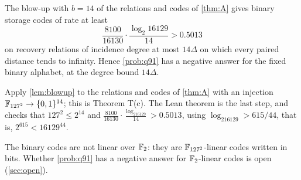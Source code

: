 \begin{corollary}[Corollary A$'$]\label{cor:Aprime}
The blow-up with $b=14$ of the relations and codes of \cref{thm:A} gives binary storage codes of rate at least
\[
  \frac{8100}{16130}\cdot\frac{\log_2 16129}{14}>0.5013
\]
on recovery relations of incidence degree at most $14\Delta$ on which every paired distance tends to infinity. Hence
\cref{prob:q91} has a negative answer for the fixed binary alphabet, at the degree bound $14\Delta$.
\end{corollary}
\begin{outline}
Apply \cref{lem:blowup} to the relations and codes of \cref{thm:A} with an injection $\mathbb{F}_{127^2}\to\{0,1\}^{14}$; this is
Theorem T(c). The Lean theorem  is the last step, and
 checks that $127^2\le2^{14}$ and
$\frac{8100}{16130}\cdot\frac{\log_216129}{14}>0.5013$, using $\log_216129>615/44$, that is, $2^{615}<16129^{44}$.
\end{outline}

The binary codes are not linear over $\mathbb{F}_2$: they are $\mathbb{F}_{127^2}$-linear codes written in bits. Whether \cref{prob:q91} has a
negative answer for $\mathbb{F}_2$-linear codes is open (\cref{sec:open}).
